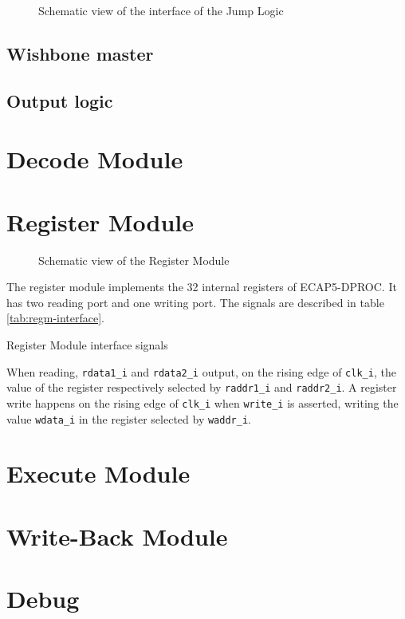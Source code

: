 \begin{figure}[h!]
    \centering
    
    \caption{Schematic view of the interface of the Jump Logic}
    \label{fig:jump-logic}
\end{figure}



\subsection{Wishbone master}

\subsection{Output logic}

\newpage
\section{Decode Module}
\newpage

\section{Register Module}

\begin{figure}[h!]
    \centering
    
    \caption{Schematic view of the Register Module}
    \label{fig:regm}
\end{figure}

\begin{content}
The register module implements the 32 internal registers of ECAP5-DPROC. It has two reading port and one writing port. The signals are described in table \ref{tab:regm-interface}. 
\end{content}

\begin{table}[H]
  \centering
  
  \caption{Register Module interface signals}
  \label{tab:regm-interface}
\end{table}

\begin{content}
  When reading, \texttt{rdata1\_i} and \texttt{rdata2\_i} output, on the rising edge of \texttt{clk\_i}, the value of the register respectively selected by \texttt{raddr1\_i} and \texttt{raddr2\_i}. A register write happens on the rising edge of \texttt{clk\_i} when \texttt{write\_i} is asserted, writing the value \texttt{wdata\_i} in the register selected by \texttt{waddr\_i}.
\end{content}

\newpage

\section{Execute Module}
\newpage

\section{Write-Back Module}
\newpage

\section{Debug}
\newpage
